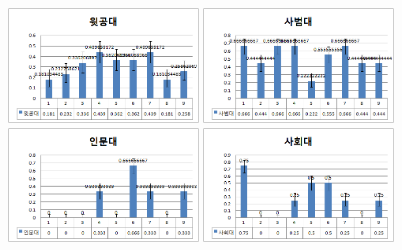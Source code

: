 \documentclass[11pt,a4paper]{article}
\begin{document}
\begin{figure}[h]
\includegraphics[width=0.45\textwidth]{4_1_3_1}
\includegraphics[width=0.45\textwidth]{4_1_3_2}
\includegraphics[width=0.45\textwidth]{4_1_3_3}
\includegraphics[width=0.45\textwidth]{4_1_3_4}
\centering
\end{figure}
\end{document}

